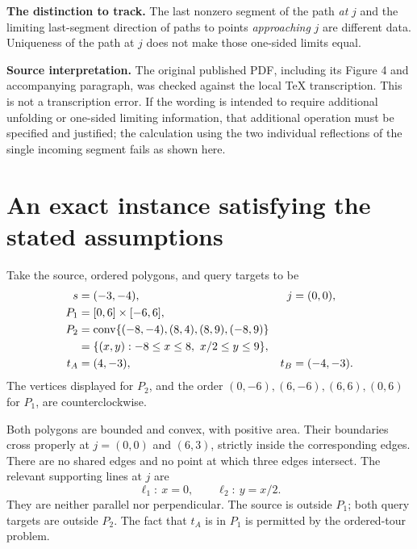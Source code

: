 \documentclass[11pt,a4paper]{article}
\newcommand{\conv}{\operatorname{conv}}
\newcommand{\sect}[2]{\section{#1}\label{#2}}
\begin{document}
\begin{resultbox}[colback=pOne!5,colframe=pOne!70!black]
\textbf{The distinction to track.} The last nonzero segment of the path
\emph{at} $j$ and the limiting last-segment direction of paths to points
\emph{approaching} $j$ are different data. Uniqueness of the path at $j$ does
not make those one-sided limits equal.
\end{resultbox}

\textbf{Source interpretation.} The original published PDF, including its
Figure 4 and accompanying paragraph, was checked against the local TeX
transcription. This is not a transcription error. If the wording is intended
to require additional unfolding or one-sided limiting information, that
additional operation must be specified and justified; the calculation using
the two individual reflections of the single incoming segment fails as shown
here.

\clearpage
\sect{An exact instance satisfying the stated assumptions}{sec:instance}

Take the source, ordered polygons, and query targets to be
\begin{align}
 s&=(-3,-4), & j&=(0,0),\notag\\
 P_1&=[0,6]\times[-6,6],\notag\\
 P_2&=\conv\{(-8,-4),(8,4),(8,9),(-8,9)\}\notag\\
    &=\{(x,y):-8\leq x\leq8,\ x/2\leq y\leq9\},\notag\\
 t_A&=(4,-3), & t_B&=(-4,-3).
 \label{eq:instance}
\end{align}
The vertices displayed for $P_2$, and the order
$(0,-6),(6,-6),(6,6),(0,6)$ for $P_1$, are counterclockwise.

Both polygons are bounded and convex, with positive area. Their boundaries
cross properly at $j=(0,0)$ and $(6,3)$, strictly inside the corresponding
edges. There are no shared edges and no point at which three edges intersect.
The relevant supporting lines at $j$ are
\begin{equation}
 \ell_1:\ x=0,\qquad \ell_2:\ y=x/2.
 \label{eq:lines}
\end{equation}
They are neither parallel nor perpendicular. The source is outside $P_1$;
both query targets are outside $P_2$. The fact that $t_A$ is in $P_1$ is
permitted by the ordered-tour problem.
\end{document}
